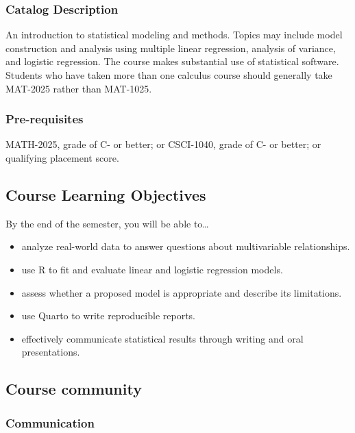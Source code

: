 \documentclass[
  letterpaper,
  DIV=11,
  numbers=noendperiod]{scrartcl}
\providecommand{\tightlist}{%
  \setlength{\itemsep}{0pt}\setlength{\parskip}{0pt}}
\begin{document}
\subsubsection{Catalog Description}\label{catalog-description}

An introduction to statistical modeling and methods. Topics may include
model construction and analysis using multiple linear regression,
analysis of variance, and logistic regression. The course makes
substantial use of statistical software. Students who have taken more
than one calculus course should generally take MAT-2025 rather than
MAT-1025.

\subsubsection{Pre-requisites}\label{pre-requisites}

MATH-2025, grade of C- or better; or CSCI-1040, grade of C- or better;
or qualifying placement score.

\subsection{Course Learning
Objectives}\label{course-learning-objectives}

By the end of the semester, you will be able to\ldots{}

\begin{itemize}
\tightlist
\item
  analyze real-world data to answer questions about multivariable
  relationships.
\item
  use R to fit and evaluate linear and logistic regression models.
\item
  assess whether a proposed model is appropriate and describe its
  limitations.
\item
  use Quarto to write reproducible reports.
\item
  effectively communicate statistical results through writing and oral
  presentations.
\end{itemize}

\subsection{Course community}\label{course-community}

\subsubsection{Communication}\label{communication}
\end{document}
